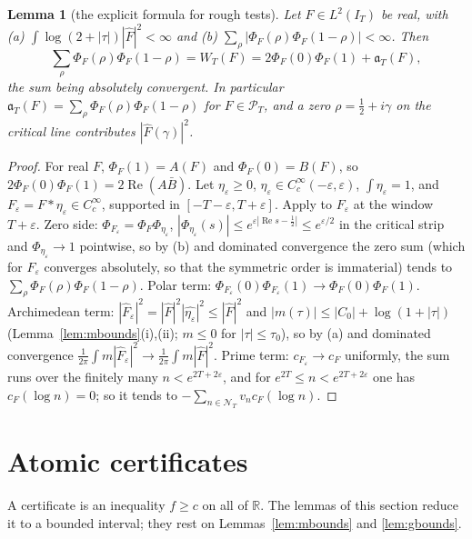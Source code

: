 \documentclass[11pt]{amsart}
\newtheorem{lemma}[theorem]{Lemma}
\theoremstyle{definition}
\theoremstyle{remark}
\newcommand{\R}{\mathbb R}
\newcommand{\Rel}{\operatorname{Re}}
\newcommand{\PT}{\mathcal P_T}
\newcommand{\IT}{I_T}
\newcommand{\Fh}{\widehat F}
\newcommand{\cF}{c_F}
\newcommand{\NT}{\mathcal N_T}
\begin{document}
\begin{lemma}[the explicit formula for rough tests]\label{lem:roughEF}
Let $F\in L^2(\IT)$ be real, with \emph{(a)} $\int\log(2+|\tau|)|\Fh|^2<\infty$ and \emph{(b)}
$\sum_\rho|\Phi_F(\rho)\Phi_F(1-\rho)|<\infty$. Then
\[
\sum_\rho\Phi_F(\rho)\Phi_F(1-\rho)=W_T(F)=2\Phi_F(0)\Phi_F(1)+\mathfrak a_T(F),
\]
the sum being absolutely convergent. In particular $\mathfrak a_T(F)=\sum_\rho\Phi_F(\rho)\Phi_F(1-\rho)$
for $F\in\PT$, and a zero $\rho=\frac12+i\gamma$ on the critical line contributes $|\Fh(\gamma)|^2$.
\end{lemma}
\begin{proof}
For real $F$, $\Phi_F(1)=A(F)$ and $\Phi_F(0)=B(F)$, so $2\Phi_F(0)\Phi_F(1)=2\Rel(A\bar B)$. Let
$\eta_\varepsilon\ge0$, $\eta_\varepsilon\in C_c^\infty(-\varepsilon,\varepsilon)$, $\int\eta_\varepsilon=1$,
and $F_\varepsilon=F*\eta_\varepsilon\in C_c^\infty$, supported in $[-T-\varepsilon,T+\varepsilon]$.
Apply \cite[Thm.~8.4]{Paper45} to $F_\varepsilon$ at the window $T+\varepsilon$. Zero side:
$\Phi_{F_\varepsilon}=\Phi_F\Phi_{\eta_\varepsilon}$, $|\Phi_{\eta_\varepsilon}(s)|\le e^{\varepsilon|\Rel s-\frac12|}\le e^{\varepsilon/2}$
in the critical strip and $\Phi_{\eta_\varepsilon}\to1$ pointwise, so by (b) and dominated convergence
the zero sum (which for $F_\varepsilon$ converges absolutely, so that the symmetric order is
immaterial) tends to $\sum_\rho\Phi_F(\rho)\Phi_F(1-\rho)$. Polar term:
$\Phi_{F_\varepsilon}(0)\Phi_{F_\varepsilon}(1)\to\Phi_F(0)\Phi_F(1)$. Archimedean term:
$|\Fh_\varepsilon|^2=|\Fh|^2|\widehat{\eta_\varepsilon}|^2\le|\Fh|^2$ and $|m(\tau)|\le|C_0|+\log(1+|\tau|)$
(Lemma~\ref{lem:mbounds}(i),(ii); $m\le0$ for $|\tau|\le\tau_0$), so by (a) and dominated convergence
$\frac1{2\pi}\int m|\Fh_\varepsilon|^2\to\frac1{2\pi}\int m|\Fh|^2$. Prime term: $c_{F_\varepsilon}\to\cF$
uniformly, the sum runs over the finitely many $n<e^{2T+2\varepsilon}$, and for
$e^{2T}\le n<e^{2T+2\varepsilon}$ one has $\cF(\log n)=0$; so it tends to $-\sum_{n\in\NT}v_n\cF(\log n)$.
\end{proof}


\section{Atomic certificates}\label{sec:tails}

A certificate is an inequality $f\ge c$ on all of $\R$. The lemmas of this section reduce it to a
bounded interval; they rest on Lemmas~\ref{lem:mbounds} and \ref{lem:gbounds}.
\end{document}
